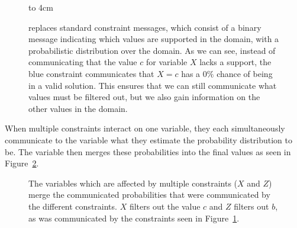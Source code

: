 \documentclass[../Document.tex]{subfiles}
\begin{document}
\begin{figure}[ht]
    \centering
    \vspace{0.5cm}
    \vbox to 4cm {
        
    }
    \caption[\acrlong{cpbp} messaging.]{\bp replaces standard constraint messages, which consist of a binary message indicating which values are supported in the domain, with a probabilistic distribution over the domain. As we can see, instead of communicating that the value $c$ for variable $X$ lacks a support, the blue constraint communicates that $X=c$ has a $0\%$ chance of being in a valid solution. This ensures that we can still communicate what values must be filtered out, but we also gain information on the other values in the domain.}
    \label{fig:cpbp_messaging}
\end{figure}

When multiple constraints interact on one variable, they each simultaneously communicate to the variable what they estimate the probability distribution to be. The variable then merges these probabilities into the final values as seen in Figure~\ref{fig:cpbp_combined}.


\begin{figure}[ht]
    \centering
    
    \caption[\acrlong{cpbp} combining probabilities]{The variables which are affected by multiple constraints ($X$ and $Z$) merge the communicated probabilities that were communicated by the different constraints. $X$ filters out the value $c$ and $Z$ filters out $b$, as was communicated by the constraints seen in Figure~\ref{fig:cpbp_messaging}.}
    \label{fig:cpbp_combined}
\end{figure}
\end{document}
